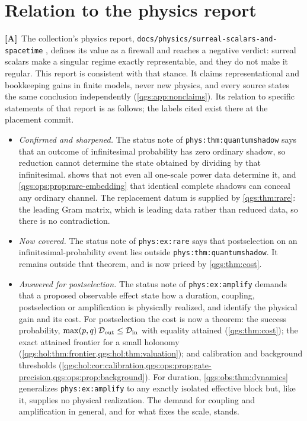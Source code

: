\documentclass[11pt,oneside]{article}
\numberwithin{equation}{section}
\theoremstyle{plain}
\theoremstyle{definition}
\theoremstyle{remark}
\newcommand{\TD}{\mathcal D}
\newcommand{\TA}{\textcolor{TierA}{\textsf{\bfseries[A]}}}
\begin{document}
\section{Relation to the physics report}\label{qgs:sec:physrel}
\TA\ The collection's physics report, \texttt{docs/physics/surreal-scalars-and-spacetime} \cite{repoPhysics}, defines its value as a firewall and reaches a negative verdict: surreal scalars make a singular regime exactly representable, and they do not make it regular. This report is consistent with that stance. It claims representational and bookkeeping gains in finite models, never new physics, and every source states the same conclusion independently (\cref{qgs:app:nonclaims}). Its relation to specific statements of that report is as follows; the labels cited exist there at the placement commit.
\begin{itemize}
\item \emph{Confirmed and sharpened.} The status note of \texttt{phys:thm:quantumshadow} says that an outcome of infinitesimal probability has zero ordinary shadow, so reduction cannot determine the state obtained by dividing by that infinitesimal.  shows that not even all one-scale power data determine it, and \cref{qgs:ops:prop:rare-embedding} that identical complete shadows can conceal any ordinary channel. The replacement datum is supplied by \cref{qgs:thm:rare}: the leading Gram matrix, which is leading data rather than reduced data, so there is no contradiction.
\item \emph{Now covered.} The status note of \texttt{phys:ex:rare} says that postselection on an infinitesimal-probability event lies outside \texttt{phys:thm:quantumshadow}. It remains outside that theorem, and is now priced by \cref{qgs:thm:cost}.
\item \emph{Answered for postselection.} The status note of \texttt{phys:ex:amplify} demands that a proposed observable effect state how a duration, coupling, postselection or amplification is physically realized, and identify the physical gain and its cost. For postselection the cost is now a theorem: the success probability, $\max(p,q)\,\TD_{\rm out}\le\TD_{\rm in}$ with equality attained (\cref{qgs:thm:cost}); the exact attained frontier for a small holonomy (\cref{qgs:hol:thm:frontier,qgs:hol:thm:valuation}); and calibration and background thresholds (\cref{qgs:hol:cor:calibration,qgs:ops:prop:gate-precision,qgs:ops:prop:background}). For duration, \cref{qgs:obs:thm:dynamics} generalizes \texttt{phys:ex:amplify} to any exactly isolated effective block but, like it, supplies no physical realization. The demand for coupling and amplification in general, and for what fixes the scale, stands.

\end{itemize}
\end{document}
